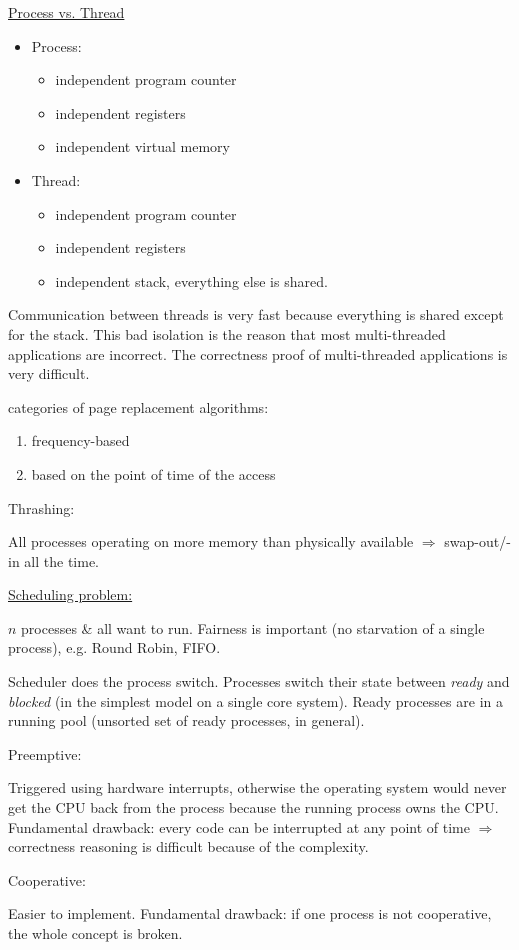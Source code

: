 \par{
	\noindent\underline{Process vs. Thread}
	\parskip0pt\begin{itemize}
		\item{
			Process:
			\parskip0pt\begin{itemize}
				\item{independent program counter}
				\item{independent registers}
				\item{independent virtual memory}
			\end{itemize}
		}
		\item{
			Thread:
			\parskip0pt\begin{itemize}
				\item{independent program counter}
				\item{independent registers}
				\item{independent stack, everything else is shared.}
			\end{itemize}
		}
	\end{itemize}
	\par{
		\noindent
		Communication between threads is very fast because everything is shared except for the stack. This bad isolation is the reason that most multi-threaded applications are incorrect. The correctness proof of multi-threaded applications is very difficult.
	}
}
\par{
	 categories of page replacement algorithms:
	\begin{enumerate}
		\item{frequency-based}
		\item{based on the point of time of the access}
	\end{enumerate}
}
\par{
	\noindent Thrashing:
	\par{
		\noindent
		All processes operating on more memory than physically available $\Rightarrow$ swap-out/-in all the time. 
	}
}
\par{
	\noindent\underline{Scheduling problem:}
	\par{
		\noindent
		$n$ processes \& all want to run. Fairness is important (no starvation of a single process), e.g. Round Robin, FIFO.
	}
	\par{
		\noindent
		Scheduler does the process switch. Processes switch their state between \textit{ready} and \textit{blocked} (in the simplest model on a single core system). Ready processes are in a running pool (unsorted set of ready processes, in general).
	}
	\par{
		\noindent
		Preemptive:
		\par{
			\noindent
			Triggered using hardware interrupts, otherwise the operating system would never get the CPU back from the process because the running process owns the CPU. Fundamental drawback: every code can be interrupted at any point of time $\Rightarrow$ correctness reasoning is difficult because of the complexity.
		}
	}
	\par{
		\noindent
		Cooperative:
		\par{
			\noindent
			Easier to implement. Fundamental drawback: if one process is not cooperative, the whole concept is broken.
		}
	}
}